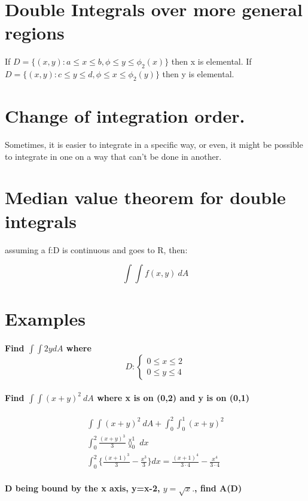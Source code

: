 \documentclass[11pt,fleqn]{book} %
\begin{document}
\section{Double Integrals over more general regions}

If $D = \{ (x,y) : a \leq x \leq b, \phi \leq y \leq \phi_2(x)  \}$
then x is elemental. If $D = \{ (x,y) : c \leq y \leq d, \phi \leq x \leq \phi_2(y)  \}$
then y is elemental.

\section{Change of integration order.}
Sometimes, it is easier to integrate in a specific way, or even, it might be possible to integrate in one on a way that can't be done in another.

\section{Median value theorem for double integrals}

assuming a f:D is continuous and goes to R, then: 

$$\int \int f(x,y) \ dA $$

\section{Examples}
\paragraph{Find $\int \int 2y dA$ where $$D: \begin{cases}
    0 \leq x \leq 2\\
    0 \leq y \leq 4
\end{cases}$$}

\paragraph{Find $\int \int (x+y)^2 \ dA$ where x is on (0,2) and y is on (0,1)}
\begin{gather}
    \int \int (x+y)^2 \ dA + \int_0^2 \int_0^1 (x+y)^2\\
    \int_0^2 \frac{(x+y)^3}{3} \between_0^1 \ dx \\
    \int_0^2 \{ \frac{(x+1)^3}{3} - \frac{x^3}{3} \} dx = \frac{(x+1)^4}{3 \cdot 4} - \frac{x^4}{3 \cdot 4} 
\end{gather}

\paragraph*{D being bound by the x axis, y=x-2, $y = \sqrt{x}.$, find A(D)}
\end{document}
